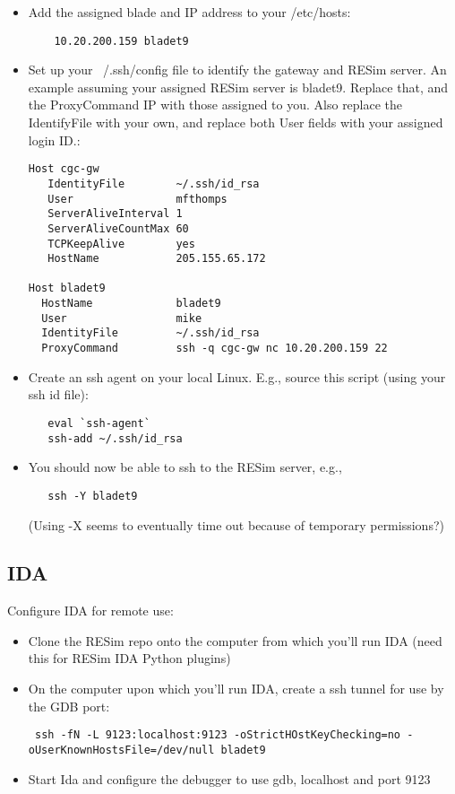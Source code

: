 \documentclass[titlepage]{article}
\begin{document}
\begin{itemize}

\item Add the assigned blade and IP address to your /etc/hosts:
\begin{verbatim}
    10.20.200.159 bladet9
\end{verbatim}

\item Set up your ~/.ssh/config file to identify the gateway and RESim server.  An example
assuming your assigned RESim server is bladet9.  Replace that, and the ProxyCommand IP with 
those assigned to you.  Also replace the IdentifyFile with your own,
and replace both User fields with your assigned login ID.:

\begin{verbatim}
Host cgc-gw
   IdentityFile        ~/.ssh/id_rsa
   User                mfthomps
   ServerAliveInterval 1
   ServerAliveCountMax 60
   TCPKeepAlive        yes
   HostName            205.155.65.172

Host bladet9
  HostName             bladet9
  User                 mike
  IdentityFile         ~/.ssh/id_rsa
  ProxyCommand         ssh -q cgc-gw nc 10.20.200.159 22
\end{verbatim}

\item Create an ssh agent on your local Linux.  E.g., source this script (using
your ssh id file):

\begin{verbatim}
   eval `ssh-agent`
   ssh-add ~/.ssh/id_rsa
\end{verbatim}

\item You should now be able to ssh to the RESim server, e.g., 
\begin{verbatim}
   ssh -Y bladet9
\end{verbatim}
(Using -X seems to eventually time out because of temporary permissions?)

\end{itemize}

\subsection{IDA}
Configure IDA for remote use:
\begin{itemize}
\item Clone the RESim repo onto the computer from which you'll run IDA (need this for RESim
IDA Python plugins)

\item On the computer upon which you'll run IDA, create a ssh tunnel for use by the GDB port:
\begin{verbatim}
 ssh -fN -L 9123:localhost:9123 -oStrictHOstKeyChecking=no -oUserKnownHostsFile=/dev/null bladet9
\end{verbatim}

\item Start Ida and configure the debugger to use gdb, localhost and port 9123
\end{itemize}
\end{document}
